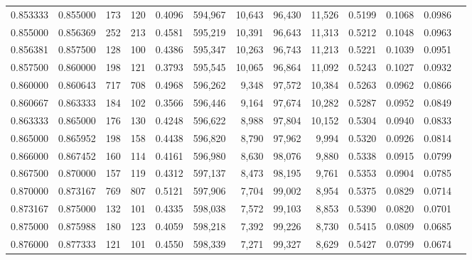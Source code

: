 \begin{tabular}{rrrrrrrrrrrrr}
0.853333 & 0.855000 &   173 & 120 &                                     0.4096 & 594,967 &  10,643 &  96,430 &  11,526 & 0.5199 & 0.1068 & 0.0986 \\
0.855000 & 0.856369 &   252 & 213 &                                     0.4581 & 595,219 &  10,391 &  96,643 &  11,313 & 0.5212 & 0.1048 & 0.0963 \\
0.856381 & 0.857500 &   128 & 100 &                                     0.4386 & 595,347 &  10,263 &  96,743 &  11,213 & 0.5221 & 0.1039 & 0.0951 \\
0.857500 & 0.860000 &   198 & 121 &                                     0.3793 & 595,545 &  10,065 &  96,864 &  11,092 & 0.5243 & 0.1027 & 0.0932 \\
0.860000 & 0.860643 &   717 & 708 &                                     0.4968 & 596,262 &   9,348 &  97,572 &  10,384 & 0.5263 & 0.0962 & 0.0866 \\
0.860667 & 0.863333 &   184 & 102 &                                     0.3566 & 596,446 &   9,164 &  97,674 &  10,282 & 0.5287 & 0.0952 & 0.0849 \\
0.863333 & 0.865000 &   176 & 130 &                                     0.4248 & 596,622 &   8,988 &  97,804 &  10,152 & 0.5304 & 0.0940 & 0.0833 \\
0.865000 & 0.865952 &   198 & 158 &                                     0.4438 & 596,820 &   8,790 &  97,962 &   9,994 & 0.5320 & 0.0926 & 0.0814 \\
0.866000 & 0.867452 &   160 & 114 &                                     0.4161 & 596,980 &   8,630 &  98,076 &   9,880 & 0.5338 & 0.0915 & 0.0799 \\
0.867500 & 0.870000 &   157 & 119 &                                     0.4312 & 597,137 &   8,473 &  98,195 &   9,761 & 0.5353 & 0.0904 & 0.0785 \\
0.870000 & 0.873167 &   769 & 807 &                                     0.5121 & 597,906 &   7,704 &  99,002 &   8,954 & 0.5375 & 0.0829 & 0.0714 \\
0.873167 & 0.875000 &   132 & 101 &                                     0.4335 & 598,038 &   7,572 &  99,103 &   8,853 & 0.5390 & 0.0820 & 0.0701 \\
0.875000 & 0.875988 &   180 & 123 &                                     0.4059 & 598,218 &   7,392 &  99,226 &   8,730 & 0.5415 & 0.0809 & 0.0685 \\
0.876000 & 0.877333 &   121 & 101 &                                     0.4550 & 598,339 &   7,271 &  99,327 &   8,629 & 0.5427 & 0.0799 & 0.0674 \\

\end{tabular}

